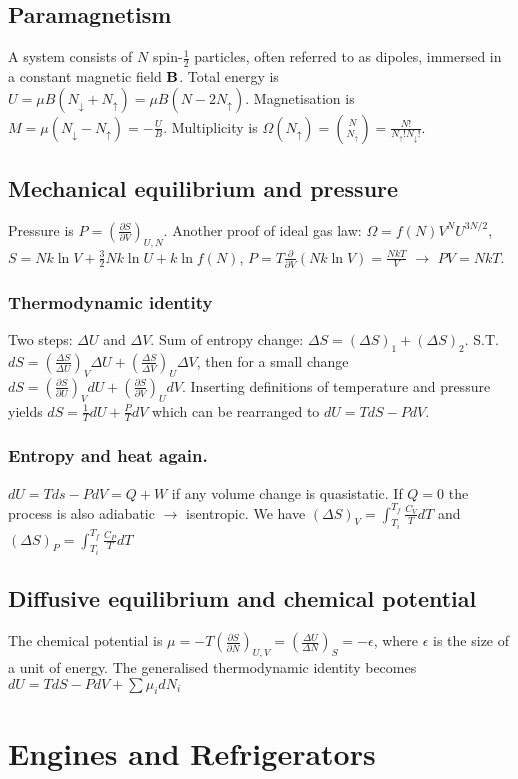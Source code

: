 \documentclass[11pt,twocolumn]{amsart}
\begin{document}
\subsection{Paramagnetism}
A system consists of $N$ spin-$\frac{1}{2}$ particles, often referred to as dipoles, immersed in a constant magnetic field $\vb{B}$. Total energy is $U=\mu B(N_\downarrow + N_\uparrow) = \mu B (N-2N_\uparrow)$. Magnetisation is $M=\mu(N_\downarrow - N_\uparrow) = -\frac{U}{B}$. Multiplicity is $\Omega(N_\uparrow) = \binom{N}{N_\uparrow}=\frac{N!}{N_\uparrow!N_\downarrow!}$.
\subsection{Mechanical equilibrium and pressure}
Pressure is $P = \left(\frac{\partial S}{\partial V} \right)_{U,N}$. Another proof of ideal gas law: $\Omega = f(N)V^NU^{3N/2}$, $S = Nk\ln V + \frac{3}{2}Nk \ln U + k \ln f(N)$, $P=T \frac{\partial}{\partial V}(Nk\ln V) = \frac{NkT}{V}$ $\rightarrow$ $PV = NkT$.
\subsubsection{Thermodynamic identity}
Two steps: $\Delta U$ and $\Delta V$. Sum of entropy change: $\Delta S = (\Delta S)_1 + (\Delta S)_2$. S.T. $dS = \left(\frac{\Delta S}{\Delta U}\right)_V \Delta U + \left(\frac{\Delta S}{\Delta V}\right)_U \Delta V$, then for a small change $dS = \left(\frac{\partial S}{\partial U}\right)_V d U + \left(\frac{\partial S}{\partial V}\right)_U d V$. Inserting definitions of temperature and pressure yields $dS = \frac{1}{T}dU + \frac{P}{T}dV$ which can be rearranged to $dU = TdS - PdV$.
\subsubsection{Entropy and heat again.}
$dU = Tds - PdV = Q + W$ if any volume change is quasistatic. If $Q = 0$ the process is also adiabatic $\rightarrow$ isentropic. We have $(\Delta S)_V = \int_{T_i}^{T_f}\frac{C_V}{T}dT$ and  $(\Delta S)_P = \int_{T_i}^{T_f}\frac{C_P}{T}dT$
\subsection{Diffusive equilibrium and chemical potential}
The chemical potential is $\mu = -T\left(\frac{\partial S}{\partial N}\right)_{U,V} = \left( \frac{\Delta U}{\Delta N}\right)_S = -\epsilon$, where $\epsilon$ is the size of a unit of energy. The generalised thermodynamic identity becomes $dU = TdS - PdV + \sum \mu_i dN_i$

\section{Engines and Refrigerators}
 
\end{document}
